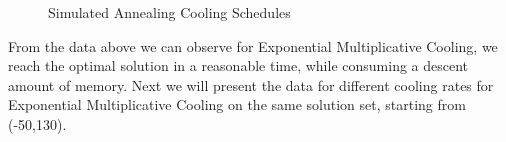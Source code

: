 \begin{figure}[!ht] %
	\centering
	\caption{Simulated Annealing Cooling Schedules}
	\label{fig:CS}
\end{figure}

From the data above we can observe for Exponential Multiplicative Cooling, we reach the optimal solution in a reasonable time, while consuming a descent amount of memory. Next we will present the data for different cooling rates for Exponential Multiplicative Cooling on the same solution set, starting from (-50,130).

